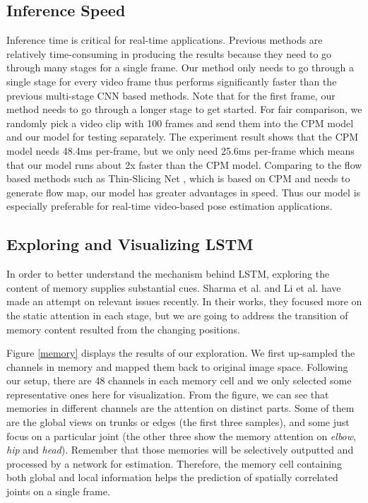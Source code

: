\documentclass[10pt,twocolumn,letterpaper]{article}
\begin{document}
\subsection{Inference Speed}
Inference time is critical for real-time applications. Previous methods are relatively time-consuming in producing the results because they need to go through many stages for a single frame. Our method only needs to go through a single stage for every video frame thus performs significantly faster than the previous multi-stage CNN based methods. Note that for the first frame, our method needs to go through a longer stage to get started. For fair comparison, we randomly pick a video clip with 100 frames and send them into the CPM model and our model for testing separately. The experiment result shows that the CPM model needs 48.4ms per-frame, but we only need 25.6ms per-frame which means that our model runs about 2x faster than the CPM model. Comparing to the flow based methods such as Thin-Slicing Net \cite{song17flowAdjST}, which is based on CPM and needs to generate flow map, our model has greater advantages in speed. Thus our model is especially preferable for real-time video-based pose estimation applications.

\subsection{Exploring and Visualizing LSTM}
In order to better understand the mechanism behind LSTM, exploring the content of memory supplies substantial cues. Sharma et al. \cite{sharma16actAtten} and Li et al. \cite{Li16convLSTMAtten} have made an attempt on relevant issues recently. In their works, they focused more on the static attention in each stage, but we are going to address the transition of memory content resulted from the changing positions.

Figure \ref{memory} displays the results of our exploration. We first up-sampled the channels in memory and mapped them back to original image space. Following our setup, there are 48 channels in each memory cell and we only selected some representative ones here for visualization. From the figure, we can see that memories in different channels are the attention on distinct parts. Some of them are the global views on trunks or edges (the first three samples), and some just focus on a particular joint (the other three show the memory attention on \textit{elbow}, \textit{hip} and \textit{head}). Remember that those memories will be selectively outputted and processed by a network for estimation. Therefore, the memory cell containing both global and local information helps the prediction of spatially correlated joints on a single frame. 
\end{document}
